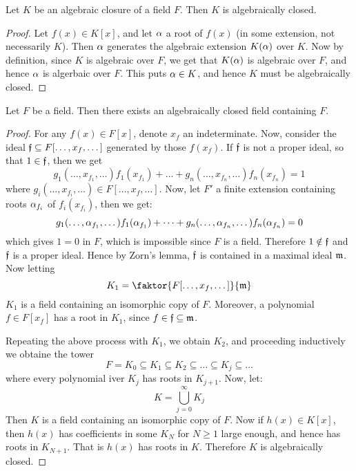 \begin{proposition}\label{propostion_8.5.3}
  Let $K$ be an algebraic closure of a field $F$. Then $K$ is
  algebraically closed.
\end{proposition}
\begin{proof}
  Let $f(x) \in K[x]$, and let $\alpha$ a root of $f(x)$ (in some
  extension, not necessarily $K$). Then $\alpha$ generates the algebraic
  extension $K(\alpha)$ over $K$. Now by definition, since $K$ is
  algebraic over $F$,  we get that $K(\alpha)$ is algebraic over $F$, and
  hence $\alpha$ is algerbaic over $F$. This puts $\alpha \in K$, and hence
  $K$ must be algebraically closed.
\end{proof}

\begin{proposition}\label{proposition_8.5.4}
  Let $F$ be a field. Then there exists an algebraically closed field
  containing $F$.
\end{proposition}
\begin{proof}
  For any $f(x) \in F[x]$, denote $x_f$ an indeterminate. Now,
  consider the ideal $\mathfrak{f} \subseteq F[\dots, x_f,\dots]$ generated by
  those $f(x_f)$. If $\mathfrak{f}$ is not a proper ideal, so that $1 \in \mathfrak{f}$,
  then we get
  \begin{equation*}
    g_1(\dots, x_{f_1}, \dots)f_1(x_{f_1})+
    \dots+g_n(\dots, x_{f_n},\dots)f_n(x_{f_n})=1
  \end{equation*}
  where $g_i(\dots, x_{f_i}, \dots) \in F[\dots, x_f, \dots]$. Now,
  let $F'$ a finite extension containing roots $\alpha_{f_i}$ of
  $f_i(x_{f_i})$, then we get:
  \begin{equation*}
    g_1(\dots, \alpha_{f_1}, \dots)f_1(\alpha_{f_1})+\dots+
    g_n(\dots, \alpha_{f_n}, \dots)f_n(\alpha_{f_n})=0
  \end{equation*}
  which gives $1=0$ in $F$, which is impossible since $F$ is a field.
  Therefore $1 \notin \mathfrak{f}$ and  $\mathfrak{f}$ is a proper ideal. Hence by
  Zorn's lemma, $\mathfrak{f}$ is contained in a maximal ideal $\mathfrak{m}$. Now
  letting
  \begin{equation*}
    K_1=\faktor{F[\dots, x_f, \dots]}{\mf}
  \end{equation*}
  $K_1$ is a field containing an isomorphic copy of $F$. Moreover, a
  polynomial $f \in F[x_f]$ has a root in $K_1$, since $f \in \mathfrak{f}
  \subseteq \mathfrak{m}$.

  Repeating the above process with $K_1$, we obtain $K_2$, and
  proceeding inductively we obtaine the tower
  \begin{equation*}
    F=K_0 \subseteq K_1 \subseteq K_2 \subseteq \dots
    \subseteq K_j \subseteq \dots
  \end{equation*}
  where every polynomial iver $K_j$ has roots in $K_{j+1}$. Now, let:
  \begin{equation*}
    K=\bigcup_{j=0}^\infty{K_j}
  \end{equation*}
  Then $K$ is a field containing an isomorphic copy of $F$. Now if
  $h(x) \in K[x]$, then $h(x)$ has coefficients in some $K_N$ for $N
  \geq 1$ large enough, and hence has roots in $K_{N+1}$. That is
  $h(x)$ has roots in $K$. Therefore $K$ is algebraically closed.
\end{proof}

